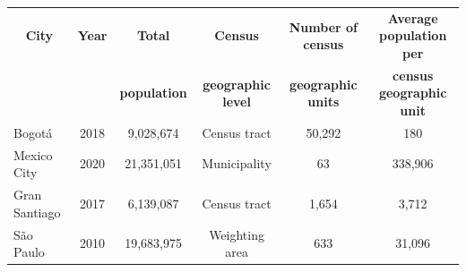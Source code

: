 \begin{tabular}{lccccc}
    \toprule
    \toprule
    \multicolumn{1}{c}{\textbf{City}} & \multicolumn{1}{c}{\textbf{Year}} & \multicolumn{1}{c}{\textbf{Total}} & \multicolumn{1}{c}{\textbf{Census}} & \multicolumn{1}{c}{\textbf{Number of census}} & \multicolumn{1}{c}{\textbf{Average population per}} \\
    & & \multicolumn{1}{c}{\textbf{population}} & \multicolumn{1}{c}{\textbf{geographic level}} & \multicolumn{1}{c}{\textbf{geographic units}} & \multicolumn{1}{c}{\textbf{census geographic unit}} \\
    \midrule
    Bogot\'a & 2018 & 9,028,674 & Census tract & 50,292 & 180 \\
    Mexico City & 2020 & 21,351,051 & Municipality & 63 & 338,906 \\
    Gran Santiago & 2017 & 6,139,087 & Census tract & 1,654 & 3,712 \\
    S\~ao Paulo & 2010 & 19,683,975 & Weighting area & 633 & 31,096 \\
    \bottomrule
    \bottomrule
\end{tabular}

